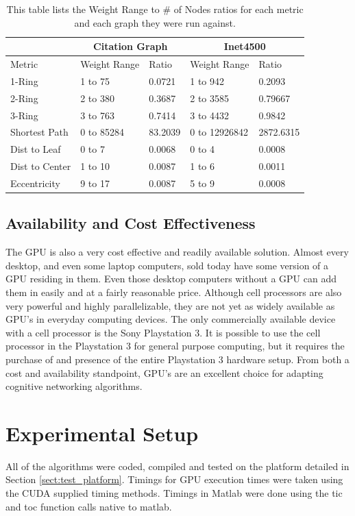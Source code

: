 \begin{table}
\begin{center}
\begin{tabular}{|l|l|l|l|l|}
\hline
 & \multicolumn{2}{|c|}{Citation Graph} & \multicolumn{2}{|c|}{Inet4500} \\
\hline
Metric & Weight Range & Ratio & Weight Range & Ratio \\
\hline
1-Ring& 1 to 75 & 0.0721 & 1 to 942 & 0.2093 \\
2-Ring & 2 to 380 & 0.3687 & 2 to 3585 & 0.79667 \\
3-Ring & 3 to 763 & 0.7414  & 3 to 4432 & 0.9842 \\
Shortest Path & 0 to 85284 & 83.2039 & 0 to 12926842 & 2872.6315 \\
Dist to Leaf & 0 to 7 & 0.0068 & 0 to 4 & 0.0008 \\
Dist to Center & 1 to 10 & 0.0087 & 1 to 6 & 0.0011 \\
Eccentricity & 9 to 17 & 0.0087 & 5 to 9 & 0.0008 \\
\hline
\end{tabular}
\caption{This table lists the Weight Range to \# of Nodes ratios for each metric and each graph they were run against.}
\label{tbl:matlab_vs_gpu_fft}
\end{center}
\end{table}

\subsection{Availability and Cost Effectiveness}
The GPU is also a very cost effective and readily available solution.  Almost every desktop, and even some laptop computers, sold today have some version of a GPU residing in them.  Even those desktop computers without a GPU can add them in easily and at a fairly reasonable price.  Although cell processors are also very powerful and highly parallelizable, they are not yet as widely available as GPU's in everyday computing devices.  The only commercially available device with a cell processor is the Sony Playstation 3.  It is possible to use the cell processor in the Playstation 3 for general purpose computing, but it requires the purchase of and presence of the entire Playstation 3 hardware setup.  From both a cost and availability standpoint, GPU's are an excellent choice for adapting cognitive networking algorithms.


\section{Experimental Setup}
All of the algorithms were coded, compiled and tested on the platform detailed in Section \ref{sect:test_platform}.  Timings for GPU execution times were taken using the CUDA supplied timing methods.  Timings in Matlab were done using the tic and toc function calls native to matlab.

